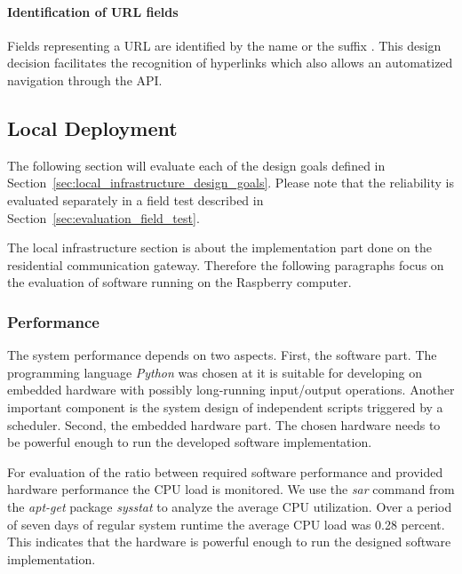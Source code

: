 \paragraph{Identification of URL fields}

Fields representing a URL are identified by the name  or the suffix .
This design decision facilitates the recognition of hyperlinks which also allows an automatized navigation through the API.



\subsection{Local Deployment}



The following section will evaluate each of the design goals defined in Section~\ref{sec:local_infrastructure_design_goals}.
Please note that the reliability is evaluated separately in a field test described in Section~\ref{sec:evaluation_field_test}.

The local infrastructure section is about the implementation part done on the residential communication gateway.
Therefore the following paragraphs focus on the evaluation of software running on the Raspberry computer.

\subsubsection{Performance}

The system performance depends on two aspects.
First, the software part.
The programming language \emph{Python} was chosen at it is suitable for developing on embedded hardware with possibly long-running input/output operations.
Another important component is the system design of independent scripts triggered by a scheduler. %
Second, the embedded hardware part.
The chosen hardware needs to be powerful enough to run the developed software implementation.

For evaluation of the ratio between required software performance and provided hardware performance the CPU load is monitored.
We use the \emph{sar} command from the \emph{apt-get} package \emph{sysstat} to analyze the average CPU utilization.
Over a period of seven days of regular system runtime the average CPU load was 0.28 percent.
This indicates that the hardware is powerful enough to run the designed software implementation.


